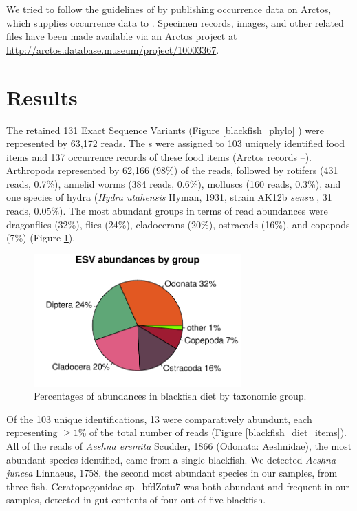 \begin{multicols}{2}
We tried to follow the guidelines of \citet{Penevetal2017} by publishing occurrence data on Arctos, which supplies occurrence data to . Specimen records, images, and other related files have been made available via an Arctos project at \url{http://arctos.database.museum/project/10003367}.

\section{Results}

The retained 131 Exact Sequence Variants (Figure \ref{blackfish_phylo} ) were represented by 63,172 reads. The s were assigned to 103 uniquely identified food items and 137 occurrence records of these food items (Arctos records --). Arthropods represented by 62,166 (98\%) of the reads, followed by rotifers (431 reads, 0.7\%), annelid worms (384 reads, 0.6\%), molluscs (160 reads, 0.3\%), and one species of hydra (\textit{Hydra utahensis} Hyman, 1931, strain AK12b \textit{sensu} \citet{Martinezetal2010}, 31 reads, 0.05\%). The most abundant groups in terms of read abundances were dragonflies (32\%), flies (24\%), cladocerans (20\%), ostracods (16\%), and copepods (7\%) (Figure \ref{blackfish_pie_chart}).

\begin{figure}[H]
\begin{center}
\vspace{2mm}
\includegraphics[width=8cm]{img/blackfish_pie_chart.pdf}
\caption{Percentages of  abundances in blackfish diet by taxonomic group.}
\label{blackfish_pie_chart}
\end{center}
\end{figure} 

Of the 103 unique identifications, 13 were comparatively abundunt, each representing $\geq 1$\% of the total number of reads (Figure \ref{blackfish_diet_items}). All of the reads of \textit{Aeshna eremita} Scudder, 1866 (Odonata: Aeshnidae), the most abundant species identified, came from a single blackfish. We detected \textit{Aeshna juncea} Linnaeus, 1758, the second most abundant species in our samples, from three fish. Ceratopogonidae sp.\ bfdZotu7 was both abundant and frequent in our samples, detected in gut contents of four out of five blackfish.


\end{multicols}
